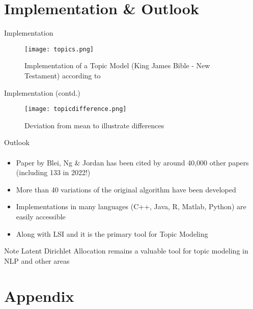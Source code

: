 \documentclass[aspectratio=169]{beamer}
\begin{document}
\section{Implementation \& Outlook}


\begin{frame}{Implementation}
  \begin{figure}
    \begin{center}
      \texttt{[image: topics.png]}
    \end{center}
    \caption{Implementation of a Topic Model (King James Bible - New Testament) according to \cite{hovy_2021}}
  \end{figure}
\end{frame}

\begin{frame}{Implementation (contd.)}
  \begin{figure}
    \begin{center}
      \texttt{[image: topicdifference.png]}
    \end{center}
    \caption{Deviation from mean to illustrate differences}
  \end{figure}
\end{frame}

\begin{frame}{Outlook}
  \framesubtitle{}
  \begin{itemize}
    
    \item Paper by Blei, Ng \& Jordan \cite{LDA} has been cited by around 40,000 other papers (including 133 in 2022!)
    \item More than 40 variations of the original algorithm have been developed \cite{jelodar2019latent}
    \item Implementations in many languages (C++, Java, R, Matlab, Python) are easily accessible
    \item Along with LSI and it is the primary tool for Topic Modeling \cite{jelodar2019latent}
  \end{itemize}
  \begin{exampleblock}{Note}
    Latent Dirichlet Allocation remains a valuable tool for topic modeling in NLP and other areas
  \end{exampleblock}
\end{frame}

\section{Appendix}
\end{document}
